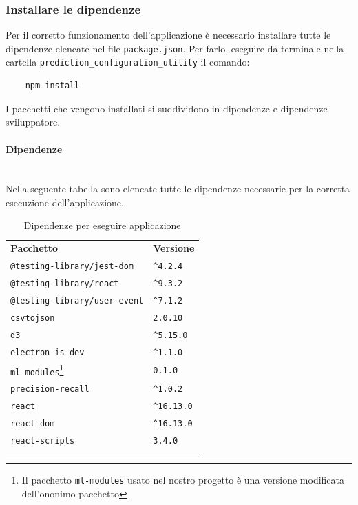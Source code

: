 \subsubsection{Installare le dipendenze}%
Per il corretto funzionamento dell'applicazione è necessario installare tutte le dipendenze elencate nel file \texttt{package.json}. Per farlo, eseguire da terminale nella cartella \verb|prediction_configuration_utility| il comando:
\begin{verbatim}
	npm install
\end{verbatim}
I pacchetti che vengono installati si suddividono in dipendenze e dipendenze sviluppatore.

\paragraph*{Dipendenze}\mbox{}\\ [1mm]
Nella seguente tabella sono elencate tutte le dipendenze necessarie per la corretta esecuzione dell'applicazione.
\mbox{}\\ [1mm]
	\setcounter{table}{0}
	\begin{longtable} {
		>{}p{65mm} 
		>{}p{30mm}
		}
    \rowcolor{gray!50}
    \textbf{Pacchetto} & \textbf{Versione} \TBstrut \\ [2mm]
    \verb|@testing-library/jest-dom| & \verb|^4.2.4|  \TBstrut \\ [2mm]
    \verb|@testing-library/react| & \verb|^9.3.2| \TBstrut \\ [2mm]
    \verb|@testing-library/user-event| & \verb|^7.1.2| \TBstrut \\ [2mm]
    \verb|csvtojson| & \verb|2.0.10| \TBstrut \\ [2mm]
    \verb|d3| & \verb|^5.15.0| \TBstrut \\ [2mm]
    \verb|electron-is-dev| & \verb|^1.1.0| \TBstrut \\ [2mm]
    \verb|ml-modules|\footnote{Il pacchetto \texttt{ml-modules} usato nel nostro progetto è una versione modificata dell'ononimo pacchetto} & \verb|0.1.0| \TBstrut \\ [2mm]
    \verb|precision-recall| & \verb|^1.0.2| \TBstrut \\ [2mm]
    \verb|react| & \verb|^16.13.0| \TBstrut \\ [2mm]
    \verb|react-dom| & \verb|^16.13.0| \TBstrut \\ [2mm]
    \verb|react-scripts| & \verb|3.4.0| \TBstrut \\ [2mm]
    \rowcolor{white}
    \caption{Dipendenze per eseguire applicazione}
    \end{longtable}
    
